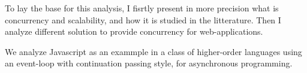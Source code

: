 To lay the base for this analysis, I fisrtly present in more precision what is concurrency and scalability, and how it is studied in the litterature.
Then I analyze different solution to provide concurrency for web-applications.


We analyze Javascript as an exammple in a class of higher-order languages using an event-loop with continuation passing style, for asynchronous programming.


% 
% 
% 




